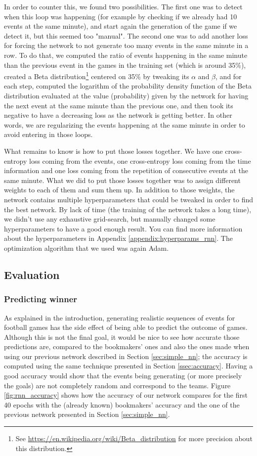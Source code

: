 \documentclass[10pt,conference,onecolumn]{IEEEtran}
\begin{document}
In order to counter this, we found two possibilities. The first one was to detect when this loop was happening (for example by checking if we already had 10 events at the same minute), and start again the generation of the game if we detect it, but this seemed too "manual". The second one was to add another loss for forcing the network to not generate too many events in the same minute in a row. To do that, we computed the ratio of events happening in the same minute than the previous event in the games in the training set (which is around 35\%), created a Beta distribution\footnote{See \url{https://en.wikipedia.org/wiki/Beta_distribution} for more precision about this distribution.} centered on 35\% by tweaking its $\alpha$ and $\beta$, and for each step, computed the logarithm of the probability density function of the Beta distribution evaluated at the value (probability) given by the network for having the next event at the same minute than the previous one, and then took its negative to have a decreasing loss as the network is getting better. In other words, we are regularizing the events happening at the same minute in order to avoid entering in those loops.

What remains to know is how to put those losses together. We have one cross-entropy loss coming from the events, one cross-entropy loss coming from the time information and one loss coming from the repetition of consecutive events at the same minute. What we did to put those losses together was to assign different weights to each of them and sum them up. In addition to those weights, the network contains multiple hyperparameters that could be tweaked in order to find the best network. By lack of time (the training of the network takes a long time), we didn't use any exhaustive grid-search, but manually changed some hyperparameters to have a good enough result. You can find more information about the hyperparameters in Appendix \ref{appendix:hyperparams_rnn}. The optimization algorithm that we used was again Adam.

\subsection{Evaluation}
\subsubsection{Predicting winner}
As explained in the introduction, generating realistic sequences of events for football games has the side effect of being able to predict the outcome of games. Although this is not the final goal, it would be nice to see how accurate those predictions are, compared to the bookmakers' ones and also the ones made when using our previous network described in Section \ref{sec:simple_nn}; the accuracy is computed using the same technique presented in Section \ref{ssec:accuracy}. Having a good accuracy would show that the events being generating (or more precisely the goals) are not completely random and correspond to the teams. Figure \ref{fig:rnn_accuracy} shows how the accuracy of our network compares for the first 40 epochs with the (already known) bookmakers' accuracy and the one of the previous network presented in Section \ref{sec:simple_nn}.
\end{document}
